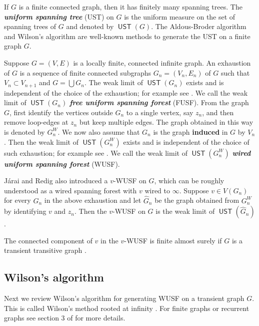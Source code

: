 \documentclass[12pt]{article}
\numberwithin{equation}{section}
\newcommand{\1}{\mathbf{1}}
\newcommand{\notion}[1]{{\bf  \textit{#1}}}
\DeclareMathOperator{\UST}{\mathsf{UST}}
\begin{document}
 
 If $G$ is a finite connected graph, then it has finitely many spanning trees. The \notion{uniform spanning tree} (UST) on $G$ is the uniform measure on the set of spanning trees of $G$ and denoted by $\UST(G)$. The Aldous-Broder algorithm and Wilson's algorithm are well-known methods to generate the UST on a finite graph $G$.
 
  Suppose $G=(V,E)$ is a locally finite, connected infinite graph. An exhaustion of $G$ is a sequence of finite connected subgraphs $G_n=(V_n,E_n)$ of $G$ such that  $V_n\subset V_{n+1}$ and $G=\bigcup G_n$. The weak limit of $\UST(G_n)$ exists and is independent of the choice of the exhaustion; for example see \cite[Section 10.1]{LP2016}.  We call the weak limit  of $\UST(G_n)$ \notion{free uniform spanning forest} (FUSF). From the graph $G$, first identify the vertices outside $G_n$ to a single vertex, say $z_n$, and then remove loop-edges at $z_n$ but keep multiple edges. The graph obtained in this way is denoted by $G_n^W$. We now also assume that $G_n$ is the graph \textbf{induced}
 in $G$ by $V_n$. Then the weak limit of $\UST(G_n^W)$ exists and is independent of the choice of such exhaustion; for example see \cite[Section 10.1]{LP2016}. We call the weak limit of $\UST(G_n^W)$  \notion{wired uniform spanning forest} (WUSF). 
 
 J\'{a}rai and Redig \cite{JR2008} also introduced a $v$-WUSF on $G$, which can be roughly understood as a wired spanning forest with $v$ wired to $\infty$. Suppose $v\in V(G_n)$ for every $G_n$ in the above exhaustion and let $\widehat{G}_n$ be the graph obtained from $G_n^W$ by identifying $v$ and $z_n$. Then the $v$-WUSF on $G$ is the weak limit of $\UST(\widehat{G}_n)$. 
 
 The connected component of $v$ in the $v$-WUSF is finite almost surely if $G$ is a transient transitive graph \cite[Proposition 3.1 and Theorem 7.4]{LMS2008}. 
 
 
 
 
 
 




\subsection{Wilson's algorithm}
 Next we review Wilson's algorithm for generating WUSF on a transient graph $G$. This is called Wilson's method rooted at infinity  \cite[Theorem 5.1]{BLPS2001}.  For finite graphs or recurrent graphs see section 3 of \cite{BLPS2001} for more details.
 
\end{document}
